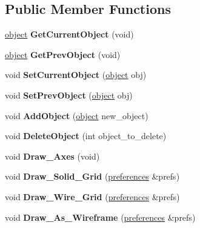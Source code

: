 \subsection*{Public Member Functions}
\begin{DoxyCompactItemize}
\item 
\mbox{\label{classscene_ae8a4fbd36a40c0ed11d51c01e238d731}} 
\hyperlink{classobject}{object} {\bfseries Get\+Current\+Object} (void)
\item 
\mbox{\label{classscene_a17d51a40abf558b00c9bda049e2c705f}} 
\hyperlink{classobject}{object} {\bfseries Get\+Prev\+Object} (void)
\item 
\mbox{\label{classscene_a5a4708c3c69900875287f1cf7d442bab}} 
void {\bfseries Set\+Current\+Object} (\hyperlink{classobject}{object} obj)
\item 
\mbox{\label{classscene_ace2490ecca01d3fb477a5143eb8fc114}} 
void {\bfseries Set\+Prev\+Object} (\hyperlink{classobject}{object} obj)
\item 
\mbox{\label{classscene_a5d65249fc091714a5a90b8b3460295fc}} 
void {\bfseries Add\+Object} (\hyperlink{classobject}{object} new\+\_\+object)
\item 
\mbox{\label{classscene_ab522eee57c9f838065af07371b3a472d}} 
void {\bfseries Delete\+Object} (int object\+\_\+to\+\_\+delete)
\item 
\mbox{\label{classscene_ac8130c521194e74bdb5a12a524ed65f1}} 
void {\bfseries Draw\+\_\+\+Axes} (void)
\item 
\mbox{\label{classscene_ac3fbb44a18b342bff48ed759dc581f7b}} 
void {\bfseries Draw\+\_\+\+Solid\+\_\+\+Grid} (\hyperlink{classpreferences}{preferences} \&prefs)
\item 
\mbox{\label{classscene_a8dd708df0ad17ee4b1bcc9a3d8946a48}} 
void {\bfseries Draw\+\_\+\+Wire\+\_\+\+Grid} (\hyperlink{classpreferences}{preferences} \&prefs)
\item 
\mbox{\label{classscene_a9bf1911c414fdebfc63b9eff66f234ad}} 
void {\bfseries Draw\+\_\+\+As\+\_\+\+Wireframe} (\hyperlink{classpreferences}{preferences} \&prefs)

\end{DoxyCompactItemize}
